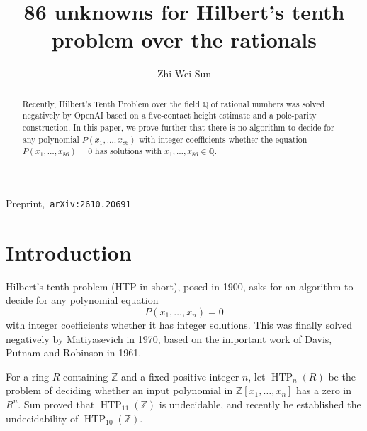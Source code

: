 \documentclass[11pt,reqno]{amsart}
\theoremstyle{definition}
\numberwithin{equation}{section}
\newcommand{\Z}{\mathbb Z}
\newcommand{\HTP}{\operatorname{HTP}}
\begin{document}
\hbox{Preprint, {\tt arXiv:2610.20691}}
\medskip

\title[86 unknowns over the rationals]{86 unknowns for Hilbert's tenth problem over the rationals}
\author[Zhi-Wei Sun]{Zhi-Wei Sun}

\address{School of Mathematics, Nanjing
University, Nanjing 210093, People's Republic of China}



\begin{abstract} Recently, Hilbert's Tenth Problem over the field $\mathbb Q$ of rational numbers was solved negatively by OpenAI based on a five-contact height estimate and a pole-parity construction. In this paper, we prove further that there is no algorithm to decide for any polynomial $P(x_1,\ldots,x_{86})$ with integer coefficients whether the equation $P(x_1,\ldots,x_{86})=0$ has solutions with $x_1,\ldots,x_{86}\in\mathbb Q$. 
\end{abstract}
\maketitle

\section{Introduction}

Hilbert's tenth problem (HTP in short), posed in 1900, asks for an algorithm to decide for any polynomial equation
$$P(x_1,\ldots,x_n)=0$$
with integer coefficients whether it has integer solutions. This was finally solved negatively by
 Matiyasevich \cite{Mat} in 1970, based on the important work of Davis, Putnam and Robinson \cite{DPR} in 1961.
 
 For a ring $R$ containing $\Z$ and a fixed positive integer $n$, let $\HTP_n(R)$ be the problem of deciding whether an input polynomial in $\Z[x_1,\ldots,x_n]$ has a zero in $R^n$. 
Sun \cite{Sun11} proved that $\HTP_{11}(\Z)$ is undecidable, and recently 
 he \cite[Corollary 1.1]{Sun10} established the undecidability of $\HTP_{10}(\Z)$.
\end{document}

